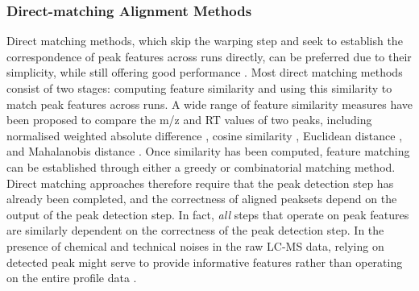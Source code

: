 \subsubsection{Direct-matching Alignment Methods}

Direct matching methods, which skip the warping step and seek to establish the correspondence of peak features across runs directly, can be preferred due to their simplicity, while still offering good performance \cite{Lange2008}. Most direct matching methods consist of two stages: computing feature similarity and using this similarity to match peak features across runs. A wide range of feature similarity measures have been proposed to compare the m/z and RT values of two peaks, including normalised weighted absolute difference \cite{Pluskal2010}, cosine similarity \cite{Hoffmann2012a}, Euclidean distance \cite{Ballardini2011}, and Mahalanobis distance \cite{Voss2011a}. Once similarity has been computed, feature matching can be established through either a greedy or combinatorial matching method. Direct matching approaches therefore require that the peak detection step has already been completed, and the correctness of aligned peaksets depend on the output of the peak detection step. In fact, \emph{all} steps that operate on peak features are similarly dependent on the correctness of the peak detection step. In the presence of chemical and technical noises in the raw LC-MS data, relying on detected peak might serve to provide informative features rather than operating on the entire profile data \cite{Smith2014}.


